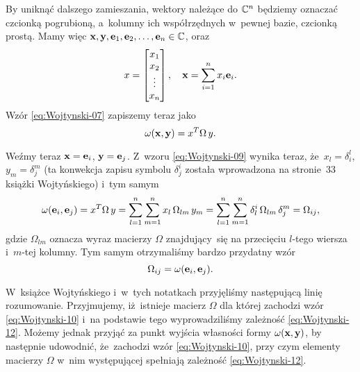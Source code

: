 \documentclass[a4paper,11pt]{article}
\begin{document}
By uniknąć dalszego zamieszania, wektory należące do
$\mathbb{C}^{ n }$ będziemy oznaczać czcionką pogrubioną, a~kolumny ich
współrzędnych w~pewnej bazie, czcionką prostą. Mamy więc
$\mathbf{x}, \mathbf{y}, \mathbf{e}_{ 1 }, \mathbf{e}_{ 2 }, \ldots, \mathbf{e}_{ n }
\in \mathbb{C}$, oraz
\begin{equation}
  \label{eq:Wojtynski-09}
  x =
  \begin{bmatrix}
    x_{ 1 } \\
    x_{ 2 } \\
    \vdots \\
    x_{ n }
  \end{bmatrix}, \quad
  \mathbf{x} = \sum_{ i = 1 }^{ n } x_{ i } \mathbf{e}_{ i }.
\end{equation}
Wzór \eqref{eq:Wojtynski-07} zapiszemy teraz jako
\begin{equation}
  \label{eq:Wojtynski-10}
  \omega( \mathbf{x}, \mathbf{y} ) = x^{ T } \Omega \, y.
\end{equation}

Weźmy teraz $\mathbf{x} = \mathbf{e}_{ i }$, $\mathbf{y} = \mathbf{e}_{ j }$.
Z~wzoru \eqref{eq:Wojtynski-09} wynika teraz, że~$x_{ l } = \delta^{ l }_{ i }$,
$y_{ m } = \delta^{ m }_{ j }$ (ta konwekcja zapisu symbolu $\delta^{ i }_{ j }$ została
wprowadzona na stronie~33 książki Wojtyńskiego) i~tym samym
\begin{equation}
  \label{eq:Wojtynski-11}
  \omega( \mathbf{e}_{ i }, \mathbf{e}_{ j } ) = x^{ T } \Omega \, y =
  \sum_{ l = 1 }^{ n } \sum_{ m = 1 }^{ n } x_{ l } \, \Omega_{ l m } \, y_{ m } =
  \sum_{ l = 1 }^{ n } \sum_{ m = 1 }^{ n } \delta^{ i }_{ l } \, \Omega_{ l m } \, \delta^{ m }_{ j } =
  \Omega_{ i j },
\end{equation}
gdzie $\Omega_{ l m }$ oznacza wyraz macierzy $\Omega$ znajdujący~się na przecięciu
$l$-tego wiersza i~$m$-tej kolumny. Tym samym otrzymaliśmy bardzo przydatny
wzór
\begin{equation}
  \label{eq:Wojtynski-12}
  \Omega_{ i j } = \omega( \mathbf{e}_{ i }, \mathbf{e}_{ j } ).
\end{equation}

W~książce Wojtyńskiego i~w~tych notatkach przyjęliśmy następującą linię
rozumowanie. Przyjmujemy, iż~istnieje macierz $\Omega$ dla której zachodzi wzór
\eqref{eq:Wojtynski-10} i~na podstawie tego wyprowadziliśmy zależność
\eqref{eq:Wojtynski-12}. Możemy jednak przyjąć za punkt wyjścia własności
formy $\omega( \mathbf{x}, \mathbf{y} )$, by następnie udowodnić, że~zachodzi wzór
\eqref{eq:Wojtynski-10}, przy czym elementy macierzy $\Omega$ w~nim występującej
spełniają zależność \eqref{eq:Wojtynski-12}.
\end{document}
